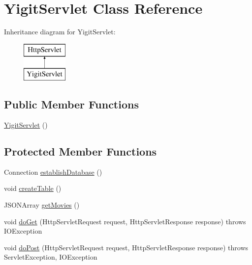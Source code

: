 \hypertarget{class_yigit_servlet}{}\section{Yigit\+Servlet Class Reference}
\label{class_yigit_servlet}
Inheritance diagram for Yigit\+Servlet\+:\begin{figure}[H]
\begin{center}
\leavevmode
\includegraphics[height=2.000000cm]{class_yigit_servlet}
\end{center}
\end{figure}
\subsection*{Public Member Functions}
\begin{DoxyCompactItemize}
\item 
\hyperlink{class_yigit_servlet_a2cf35716343b40ed5d31bc20bd0e4281}{Yigit\+Servlet} ()
\end{DoxyCompactItemize}
\subsection*{Protected Member Functions}
\begin{DoxyCompactItemize}
\item 
Connection \hyperlink{class_yigit_servlet_afbf5525cf34aecfbc5c2d7c0a5398d45}{establish\+Database} ()
\item 
void \hyperlink{class_yigit_servlet_a35736a61d3f45e288c437771c29050cd}{create\+Table} ()
\item 
J\+S\+O\+N\+Array \hyperlink{class_yigit_servlet_acb708f5a65546d97991965287c3f226d}{get\+Movies} ()
\item 
void \hyperlink{class_yigit_servlet_a87f5660fd804020140513bfd608a1fad}{do\+Get} (Http\+Servlet\+Request request, Http\+Servlet\+Response response)  throws I\+O\+Exception  
\item 
void \hyperlink{class_yigit_servlet_a6b23eda49b2fe7abb63786c20fe01d75}{do\+Post} (Http\+Servlet\+Request request, Http\+Servlet\+Response response)  throws Servlet\+Exception, I\+O\+Exception 
\end{DoxyCompactItemize}


